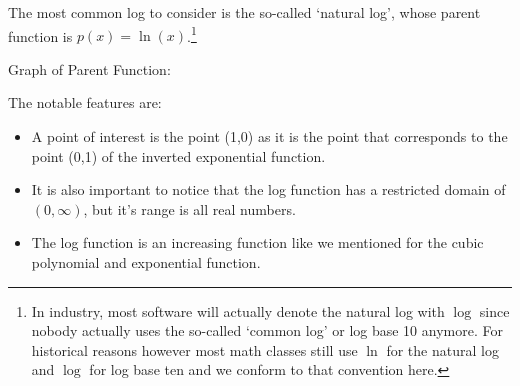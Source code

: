 \documentclass{ximera}
\begin{document}
        \begin{description}
            \item[Parent Function:] The most common log to consider is the so-called `natural log', whose parent function is $p(x) = \ln(x)$.\footnote{In industry, most software will actually denote the natural log with $\log$ since nobody actually uses the so-called `common log' or log base 10 anymore. For historical reasons however most math classes still use $\ln$ for the natural log and $\log$ for log base ten and we conform to that convention here.}\\
            \begin{minipage}{\textwidth}\item[Graph of Parent Function:]\hspace*{0pt} \\
                \begin{center}
                \end{center}
            \end{minipage}
            
            \item[Notable Features of Graph:] The notable features are:
            \begin{itemize}
                \item A point of interest is the point (1,0) as it is the point that corresponds to the point (0,1) of the inverted exponential function.
                \item It is also important to notice that the log function has a restricted domain of $(0,\infty)$, but it's range is all real numbers.
                \item The log function is an increasing function like we mentioned for the cubic polynomial and exponential function.
            \end{itemize}
            

\end{description}
\end{document}
